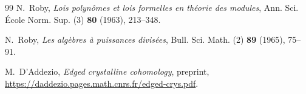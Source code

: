 \documentclass[11pt]{amsart}
\theoremstyle{plain}
\theoremstyle{definition}
\theoremstyle{remark}
\begin{document}
\begin{thebibliography}{99}
N.~Roby, \emph{Lois polynômes et lois formelles en théorie des modules}, Ann. Sci. École Norm. Sup. (3) \textbf{80} (1963), 213--348.

N.~Roby, \emph{Les algèbres à puissances divisées}, Bull. Sci. Math. (2) \textbf{89} (1965), 75--91.

M.~D'Addezio, \emph{Edged crystalline cohomology}, preprint, \url{https://daddezio.pages.math.cnrs.fr/edged-crys.pdf}.

\end{thebibliography}
\end{document}
